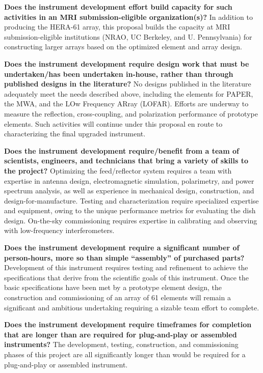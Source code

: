 \documentclass[preprint]{aastex}
\begin{document}
{\bf Does the instrument development effort build capacity for such activities in an MRI submission-eligible organization(s)?}
In addition to producing the HERA-61 array, this proposal builds the capacity at MRI submission-eligible
institutions
(NRAO, UC Berkeley, and U. Pennsylvania) for constructing larger arrays based on the optimized
element and array design.

{\bf Does the instrument development require design work that must be undertaken/has been undertaken in-house, rather than through published designs in the literature?}
No designs published in the literature adequately meet the needs described above, including the elements
for PAPER, the MWA, and the LOw Frequency ARray (LOFAR).  
Efforts are underway to measure the reflection, cross-coupling, and polarization performance of prototype
elements. Such activities will continue under this proposal en route to characterizing
the final upgraded instrument.

{\bf Does the instrument development require/benefit from a team of scientists, engineers, and technicians that bring a variety of skills to the project?}
Optimizing the feed/reflector system 
requires a team with expertise in antenna design,
electromagnetic simulation, polarimetry, and power spectrum analysis, as well as 
experience in mechanical design, construction, and design-for-manufacture.
Testing and characterization require specialized expertise and equipment, owing to
the unique performance metrics for evaluating the dish design.  On-the-sky commissioning
requires expertise in calibrating and observing with
low-frequency interferometers.

{\bf Does the instrument development require a significant number of person-hours, more so than simple ``assembly'' of purchased parts?}
Development of this instrument requires testing and refinement to achieve the specifications that derive
from the scientific goals of this instrument.  Once the basic specifications have been met by a prototype
element design, the construction and commissioning of an array of 61 elements will remain a significant and
ambitious undertaking requiring a sizable team effort to complete.

{\bf Does the instrument development require timeframes for completion that are longer than are required for plug-and-play or assembled instruments?}
The development, testing, construction, and commissioning phases of this project are all significantly longer
than would be required for a plug-and-play or assembled instrument.
\end{document}

